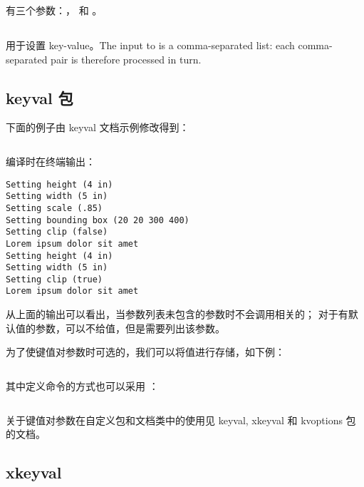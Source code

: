  有三个参数：，
 和 。

\subsection{\protect{}}

 用于设置 key-value。The input to  is a comma-separated list: each comma-separated  pair is therefore processed in turn. 

\subsection{ keyval 包}

下面的例子由 keyval 文档示例修改得到：

\inputminted[linenos]{latex}{../examples/programming/keyval-command-with-parameters.tex}

编译时在终端输出：

\begin{verbatim}
Setting height (4 in)
Setting width (5 in)
Setting scale (.85)
Setting bounding box (20 20 300 400)
Setting clip (false)
Lorem ipsum dolor sit amet
Setting height (4 in)
Setting width (5 in)
Setting clip (true)
Lorem ipsum dolor sit amet
\end{verbatim}

从上面的输出可以看出，当参数列表未包含的参数时不会调用相关的；
对于有默认值的参数，可以不给值，但是需要列出该参数。

为了使键值对参数时可选的，我们可以将值进行存储，如下例：

\inputminted[linenos]{latex}{../examples/programming/keyval-command-with-optional-parameters1.tex}

其中定义命令的方式也可以采用 ：

\inputminted[firstline=30,lastline=42]{latex}{../examples/programming/keyval-command-with-optional-parameters2.tex}

关于键值对参数在自定义包和文档类中的使用见 keyval, xkeyval 和 kvoptions 包的文档。

\subsection{xkeyval}

\inputminted{latex}{../examples/programming/xkeyval-command-with-optional-parameters.tex}
 
